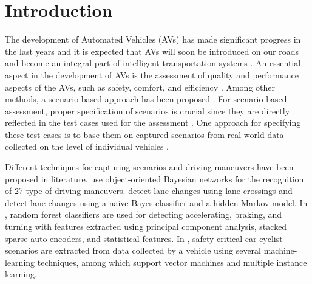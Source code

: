 \section{Introduction}
\label{sec:introduction}

\cstarta
The development of Automated Vehicles (AVs) has made significant progress in the last years and it is expected that AVs will soon be introduced on our roads \autocite{madni2018autonomous,bimbraw2015autonomous} and become an integral part of intelligent transportation systems \autocite{chanedmiston2020itsjpo}. 
An essential aspect in the development of AVs is the assessment of quality and performance aspects of the AVs, such as safety, comfort, and efficiency \autocite{bengler2014threedecades, stellet2015taxonomy}. 
Among other methods, a scenario-based approach has been proposed \autocite{elrofai2018scenario, putz2017pegasus}. 
For scenario-based assessment, proper specification of scenarios is crucial since they are directly reflected in the test cases used for the assessment \autocite{stellet2015taxonomy}. 
One approach for specifying these test cases is to base them on captured scenarios from real-world data collected on the level of individual vehicles \autocite{elrofai2018scenario, putz2017pegasus, roesener2016scenariobased, deGelder2017assessment}. 

Different techniques for capturing scenarios and driving maneuvers have been proposed in literature. 
\textcite{kasper2012oobayesnetworks} use object-oriented Bayesian networks for the recognition of 27 type of driving maneuvers. 
\textcite{krajewski2018highD} detect lane changes using lane crossings and \textcite{schlechtriemen2015lanechange} detect lane changes using a naive Bayes classifier and a hidden Markov model. 
In \autocite{xie2017driving}, random forest classifiers are used for detecting accelerating, braking, and turning with features extracted using principal component analysis, stacked sparse auto-encoders, and statistical features.
In \autocite{cara2015carcyclist}, safety-critical car-cyclist scenarios are extracted from data collected by a vehicle using several machine-learning techniques, among which support vector machines and multiple instance learning.

